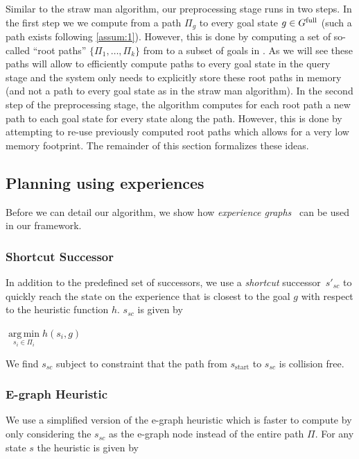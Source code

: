 \documentclass[conference]{IEEEtran}
\DeclareMathOperator*{\argmin}{arg\,min}
\begin{document}
Similar to the straw man algorithm, our preprocessing stage runs in two steps.
In the first step we we compute from \Shome a path $\Pi_g$ to every goal state $ g \in G^{\textrm{full}}$ (such a path exists following \ref{assum:1}). However, this is done by computing a set of so-called ``root paths'' $\{\Pi_1, \ldots, \Pi_k \}$ from \Shome to a subset of goals in \Gfull. 
As we will see these paths will allow to efficiently compute paths to every goal state in the query stage and the system only needs to explicitly store these root paths in memory (and not a path to every goal state as in the straw man algorithm).
%
In the second step of the preprocessing stage, the algorithm computes for each root path a new path to each goal state for every state along the path. However, this is done by attempting to re-use previously computed root paths which allows for a very low memory footprint.
%
The remainder of this section formalizes these ideas.

\subsection{Planning using experiences}
\label{subsec:experience}
Before we can detail our algorithm, we show how \emph{experience graphs}~\cite{PCCL12} can be used in our framework.

\subsubsection{Shortcut Successor}

In addition to the predefined set of successors, we use a \textit{shortcut} successor~$s'_{sc}$ to quickly reach the state on the experience that is closest to the goal $g$ with respect to the heuristic function $h$. $s_{sc}$ is given by

\begin{center}
 $\argmin\limits_{s_i \in \Pi_i} h(s_i, g)$
\end{center}

We find $s_{sc}$ subject to constraint that the path from $s_{\textrm{start}}$ to $s_{sc}$ is collision free. 

\subsubsection{E-graph Heuristic}
We use a simplified version of the e-graph heuristic which is faster to compute by only considering the $s_{sc}$ as the e-graph node instead of the entire path $\Pi$. For any state $s$ the heuristic is given by
\end{document}
